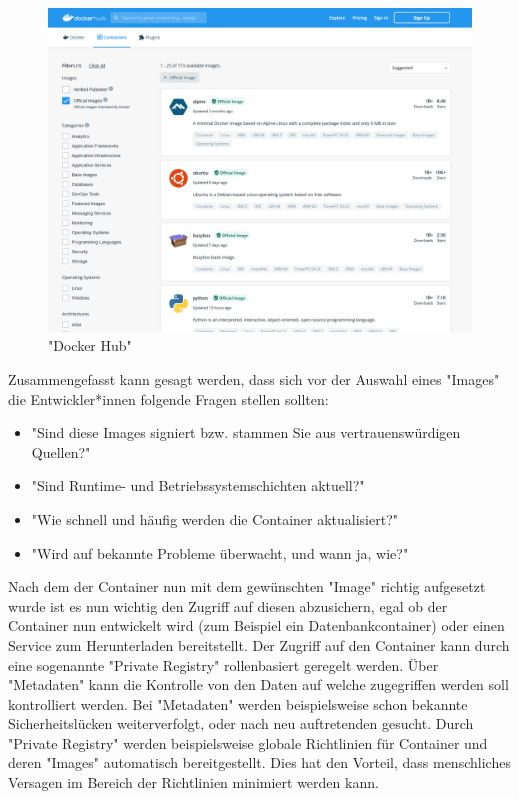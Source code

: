 \begin{figure}[H]
    \centering
    \includegraphics[width=\textwidth]{media/DockerAndContainering/DockerHub.png}
    \caption{"Docker Hub" \cite{DockerHub}}
\end{figure}

Zusammengefasst kann gesagt werden, dass sich vor der Auswahl eines "Images" die Entwickler*innen folgende Fragen stellen sollten:

\begin{itemize}
    \item "Sind diese Images signiert bzw. stammen Sie aus vertrauenswürdigen Quellen?" \cite{ContainerSecurity}
    \item "Sind Runtime- und Betriebssystemschichten aktuell?" \cite{ContainerSecurity}
    \item "Wie schnell und häufig werden die Container aktualisiert?" \cite{ContainerSecurity}
    \item "Wird auf bekannte Probleme überwacht, und wann ja, wie?" \cite{ContainerSecurity}
\end{itemize}


Nach dem der Container nun mit dem gewünschten "Image" richtig aufgesetzt wurde ist es nun wichtig den Zugriff auf diesen abzusichern, egal ob der Container nun entwickelt wird (zum Beispiel ein Datenbankcontainer) oder einen Service zum Herunterladen bereitstellt. Der Zugriff auf den Container kann durch eine sogenannte "Private Registry" rollenbasiert geregelt werden. Über "Metadaten" kann die Kontrolle von den Daten auf welche zugegriffen werden soll kontrolliert werden. Bei "Metadaten" werden beispielsweise schon bekannte Sicherheitslücken weiterverfolgt, oder nach neu auftretenden gesucht. Durch "Private Registry" werden beispielsweise globale Richtlinien für Container und deren "Images" automatisch bereitgestellt. Dies hat den Vorteil, dass menschliches Versagen im Bereich der Richtlinien minimiert werden kann. \cite{ContainerSecurity}

